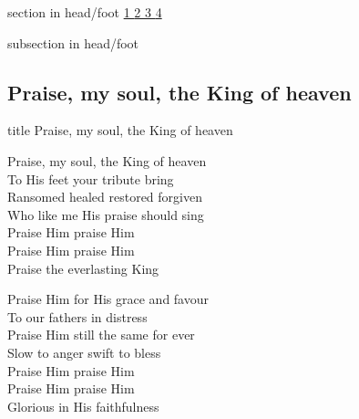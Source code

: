 \documentclass[aspectratio=169]{beamer}
\begin{document}
{
{ 
 {
 \begin{beamercolorbox}[ht=4.5ex,dp=1.5ex,%
      leftskip=.3cm,rightskip=.3cm plus1fil]{section in head/foot}
 \fontsize{12}{25}\selectfont 
\hyperlink{Praise, my soul, the King of heaven[]1}{1  }\hyperlink{Praise, my soul, the King of heaven[]2}{2  }\hyperlink{Praise, my soul, the King of heaven[]3}{3  }\hyperlink{Praise, my soul, the King of heaven[]4}{4  } 
 \end{beamercolorbox}%
  \begin{beamercolorbox}[ht=2.5ex,dp=1.125ex,%
   leftskip=.3cm,rightskip=.3cm plus1fil]{subsection in head/foot}
   \insertauthor
 \end{beamercolorbox}%
 }
}
\subsection{Praise, my soul, the King of heaven}
\hypertarget{Praise, my soul, the King of heaven[]}{}
\begin{frame}{}
 \vfill
  \centering
  \begin{beamercolorbox}[sep=8pt,center,shadow=true,rounded=true]{title}
    Praise, my soul, the King of heaven     
  \end{beamercolorbox}
  \vfill
\end{frame}

\hypertarget{Praise, my soul, the King of heaven[]1}{}
\begin{frame}{}
\fontsize{21.428571428571427}{25.71428571428571}\selectfont

Praise, my soul, the King of heaven\\ 
To His feet your tribute bring\\ 
Ransomed healed restored forgiven\\ 
Who like me His praise should sing\\ 
Praise Him praise Him\\ 
Praise Him praise Him\\ 
Praise the everlasting King

\end{frame}
\hypertarget{Praise, my soul, the King of heaven[]2}{}
\begin{frame}{}
\fontsize{21.428571428571427}{25.71428571428571}\selectfont

Praise Him for His grace and favour\\ 
To our fathers in distress\\ 
Praise Him still the same for ever\\ 
Slow to anger swift to bless\\ 
Praise Him praise Him\\ 
Praise Him praise Him\\ 
Glorious in His faithfulness


\end{frame}}
\end{document}
